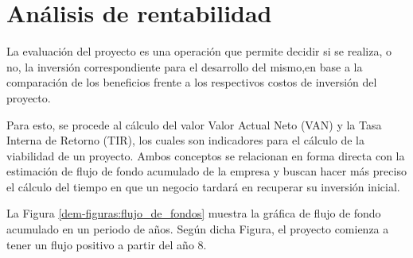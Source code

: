 \section{Análisis de rentabilidad}

La evaluación del proyecto es una operación que permite decidir si se realiza, o no, la inversión correspondiente para el desarrollo del mismo,en base a la comparación de los beneficios frente a los respectivos costos de inversión del proyecto.

Para esto, se procede al cálculo del valor Valor Actual Neto (VAN) y la Tasa Interna de Retorno (TIR), los cuales son indicadores para el cálculo de la viabilidad de un proyecto. Ambos conceptos se relacionan en forma directa con la estimación de flujo de fondo acumulado de la empresa y buscan hacer más preciso el cálculo del tiempo en que un negocio tardará en recuperar su inversión inicial.

La Figura \ref{dem-figuras:flujo_de_fondos} muestra la gráfica de flujo de fondo acumulado en un periodo de  años. Según dicha Figura, el proyecto comienza a tener un flujo positivo a partir del año 8.





